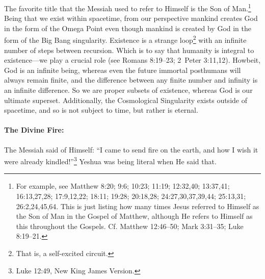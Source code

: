 \documentclass[letterpaper,12pt]{article}
\begin{document}
The favorite title that the Messiah used to refer to Himself is the Son of Man.\footnote{For example, see Matthew 8:20; 9:6; 10:23; 11:19; 12:32,40; 13:37,41; 16:13,27,28; 17:9,12,22; 18:11; 19:28; 20:18,28; 24:27,30,37,39,44; 25:13,31; 26:2,24,45,64. This is just listing how many times Jesus referred to Himself as the Son of Man in the Gospel of Matthew, although He refers to Himself as this throughout the Gospels. Cf. Matthew 12:46--50; Mark 3:31--35; Luke 8:19--21.} Being that we exist within spacetime, from our perspective mankind creates God in the form of the Omega Point even though mankind is created by God in the form of the Big Bang singularity. Existence is a strange loop\footnote{That is, a self-excited circuit.} with an infinite number of steps between recursion. Which is to say that humanity is integral to existence---we play a crucial role (see Romans 8:19--23; 2~Peter 3:11,12). Howbeit, God is an infinite being, whereas even the future immortal posthumans will always remain finite, and the difference between any finite number and infinity is an infinite difference. So we are proper subsets of existence, whereas God is our ultimate superset. Additionally, the Cosmological Singularity exists outside of spacetime, and so is not subject to time, but rather is eternal.

\paragraph{The Divine Fire:}
\label{parag:DivineFire}

The Messiah said of Himself: ``I came to send fire on the earth, and how I wish it were already kindled!''\footnote{Luke 12:49, New King James Version.} Yeshua was being literal when He said that.
\end{document}
